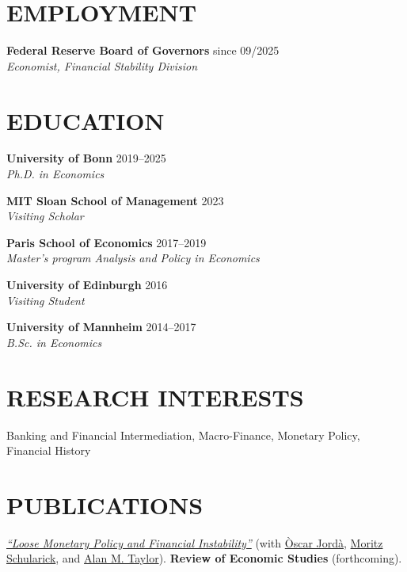 \documentclass{res}
\begin{document}
 
\address{
  \href{mailto:maximilian.grimm@frb.gov}{maximilian.grimm@frb.gov} 
  \\
  +1 (202) 809-4278
  \\
  \href{https://maximiliangrimm.com/}{https://maximiliangrimm.com/} 
}


\begin{resume}
\vspace{0.0in}

\section{EMPLOYMENT}
\vspace{0.05in}

    \textbf{Federal Reserve Board of Governors} \hfill since 09/2025
    \\
    \emph{Economist, Financial Stability Division}

\section{EDUCATION}
\vspace{0.05in}

 
    \textbf{University of Bonn} \hfill 2019--2025
    \\
    \emph{Ph.D. in Economics}

    \textbf{MIT Sloan School of Management} \hfill 2023
    \\
    \emph{Visiting Scholar}
 
    \textbf{Paris School of Economics} \hfill 2017--2019
    \\
    \emph{Master's program Analysis and Policy in Economics} 

    \textbf{University of Edinburgh} \hfill 2016
    \\
    \emph{Visiting Student}

    \textbf{University of Mannheim} \hfill 2014--2017
    \\
    \emph{B.Sc. in Economics} 
 

\section{RESEARCH INTERESTS}
\vspace{0.05in}
    Banking and Financial Intermediation, Macro-Finance, Monetary Policy, Financial History


\section{PUBLICATIONS}
\vspace{0.05in}
    \href{https://doi.org/10.1093/restud/rdag044}{\emph{``Loose Monetary Policy and Financial Instability''}} (with \href{https://sites.google.com/site/oscarjorda/}{\`Oscar Jord\`a}, \href{https://www.moritzschularick.com/}{Moritz Schularick}, and \href{https://sites.google.com/view/amtaylor/home}{Alan M. Taylor}).
    \textbf{Review of Economic Studies} (forthcoming).



\end{resume}
\end{document}
